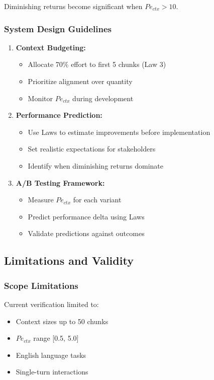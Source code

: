 \documentclass[conference]{IEEEtran}
\begin{document}
Diminishing returns become significant when $Pe_{ctx} > 10$.

\subsubsection{System Design Guidelines}

\begin{enumerate}
\item \textbf{Context Budgeting:}
   \begin{itemize}
   \item Allocate 70\% effort to first 5 chunks (Law 3)
   \item Prioritize alignment over quantity
   \item Monitor $Pe_{ctx}$ during development
   \end{itemize}

\item \textbf{Performance Prediction:}
   \begin{itemize}
   \item Use Laws to estimate improvements before implementation
   \item Set realistic expectations for stakeholders
   \item Identify when diminishing returns dominate
   \end{itemize}

\item \textbf{A/B Testing Framework:}
   \begin{itemize}
   \item Measure $Pe_{ctx}$ for each variant
   \item Predict performance delta using Laws
   \item Validate predictions against outcomes
   \end{itemize}
\end{enumerate}

\subsection{Limitations and Validity}

\subsubsection{Scope Limitations}

Current verification limited to:
\begin{itemize}
\item Context sizes up to 50 chunks
\item $Pe_{ctx}$ range [0.5, 5.0]
\item English language tasks
\item Single-turn interactions
\end{itemize}
\end{document}
